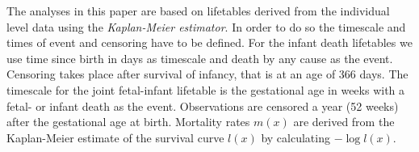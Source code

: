 \documentclass[12pt, parskip=half]{scrartcl}
\begin{document}
\begin{appendix}
The analyses in this paper are based on lifetables derived from the individual level data using the \emph{Kaplan-Meier estimator}. In order to do so the timescale and times of event and censoring have to be defined. For the infant death lifetables we use time since birth in days as timescale and death by any cause as the event. Censoring takes place after survival of infancy, that is at an age of 366 days. The timescale for the joint fetal-infant lifetable is the gestational age in weeks with a fetal- or infant death as the event. Observations are censored a year (52 weeks) after the gestational age at birth. Mortality rates $m(x)$ are derived from the Kaplan-Meier estimate of the survival curve $l(x)$ by calculating $-\log l(x)$.

\end{appendix}
\end{document}
